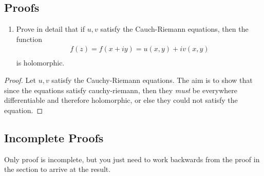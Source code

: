 \subsection{Proofs}
\begin{enumerate}
	\item Prove in detail that if $u, v$ satisfy the Cauch-Riemann equations, then the function
	\begin{align*}
		f(z) = f(x + iy) = u(x, y) + iv(x, y) \\
	\end{align*}
	is holomorphic.
\end{enumerate}
\begin{proof}
	Let $u,v$ satisfy the Cauchy-Riemann equations. The aim is to show that since the equations satisfy cauchy-riemann,
	then they \emph{must} be everywhere differentiable and therefore holomorphic, or else they could not satisfy the equation.
\end{proof}

\subsection{Incomplete Proofs}
Only proof is incomplete, but you just need to work backwards from the proof in the section to arrive at the result.
